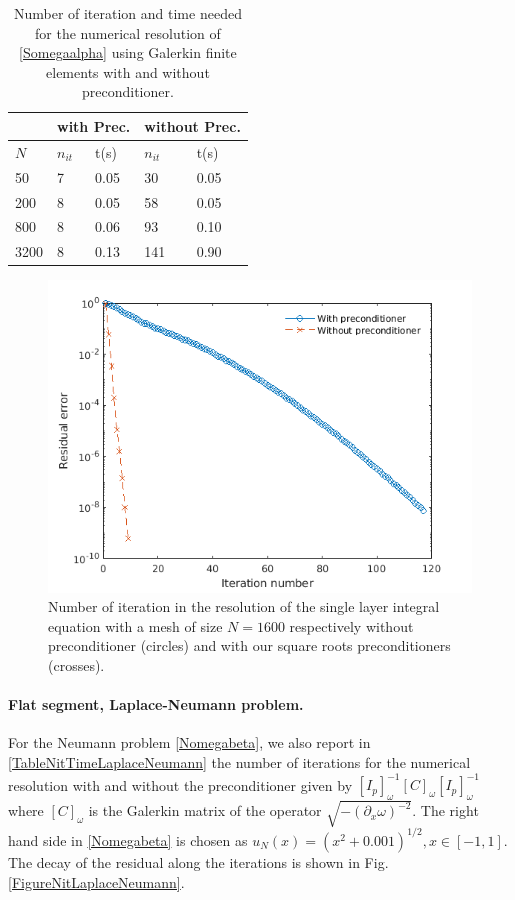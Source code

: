 \documentclass[a4paper]{article}
\begin{document}
\begin{table}[H]
	\begin{center}
		\begin{tabular}{m{4em}|m{4em}|m{4em}|m{4em}| m{4em}} 
			\hline
			\multicolumn{1}{c|}{ }&
			\multicolumn{2}{c|}{with Prec.}&\multicolumn{2}{c}{without Prec.}\\
			\hline
			$N$ & $n_{it}$& t(s) & $n_{it}$ & t(s)\\
			\hline\hline
			50 & 7 & 0.05 & 30 & 0.05\\
			\hline
			200 & 8 & 0.05 & 58 & 0.05\\
			\hline
			800 & 8 & 0.06 & 93 & 0.10 \\
			\hline
			3200 & 8 & 0.13 & 141 & 0.90\\
			\hline
		\end{tabular}	
		\caption{Number of iteration and time needed for the numerical resolution of \eqref{Somegaalpha} using Galerkin finite elements with and without preconditioner.}
		\label{TableNitTimeLaplaceDirichlet}
	\end{center}
\end{table}
\begin{figure}[H]
	\centering
	\includegraphics[scale=0.5]{figs/PrecondDirichletLaplaceSegbis.png}
	\caption{Number of iteration in the resolution of the single layer integral equation with a mesh of size $N = 1600$ respectively without preconditioner (circles) and with our square roots preconditioners (crosses).}
	\label{FigureNitLaplaceDirichlet}
\end{figure}

\paragraph{Flat segment, Laplace-Neumann problem.} 
For the Neumann problem \eqref{Nomegabeta}, we also report in \autoref{TableNitTimeLaplaceNeumann} the number of iterations for the 
numerical resolution with and without the preconditioner given by $[I_p]^{-1}_{\omega} \left[C \right]_\omega [I_p]^{-1}_{\omega}$ where $\left[ C \right]_\omega$ 
is the Galerkin matrix of the operator $\sqrt{ -( \partial_x \omega)^{-2}}$. The right hand side in \eqref{Nomegabeta} is chosen as 
$u_N(x) = (x^2 + 0.001)^{1/2}, x \in [-1,1]$. The decay of the residual along the iterations is shown in Fig. \ref{FigureNitLaplaceNeumann}.
\end{document}
